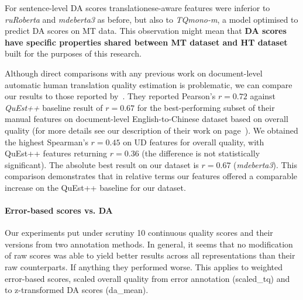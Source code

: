 For sentence-level DA scores translationese-aware features were inferior to \textit{ruRoberta} and \textit{mdeberta3} as before, but also to \textit{TQmono-m}, a model optimised to predict DA scores on MT data. This observation might mean that \textbf{DA scores have specific properties shared between MT dataset and HT dataset} built for the purposes of this research. 

Although direct comparisons with any previous work on document-level automatic human translation quality estimation is problematic, we can compare our results to those reported by~\cite{Yuan2018}. %
They reported Pearson's $r=0.72$ against \textit{QuEst++} baseline result of $r=0.67$ for the best-performing subset of their manual features on document-level English-to-Chinese dataset based on overall quality (for more details see our description of their work on page~\pageref{pg:yuan_previous}). %
We obtained the highest Spearman's $r=0.45$ on UD features for overall quality, with QuEst++ features returning $r=0.36$ (the difference is not statistically significant). The absolute best result on our dataset is $r=0.67$ (\textit{mdeberta3}). This comparison demonstrates that in relative terms our features offered a comparable increase on the QuEst++ baseline for our dataset. %


\paragraph{Error-based scores vs. DA}
Our experiments put under scrutiny 10 continuous quality scores and their versions from two annotation methods.
In general, it seems that no modification of raw scores was able to yield better results across all representations than their raw counterparts. If anything they performed worse. This applies to weighted error-based scores, scaled overall quality from error annotation (scaled\_tq) and to z-transformed DA scores (da\_mean).

